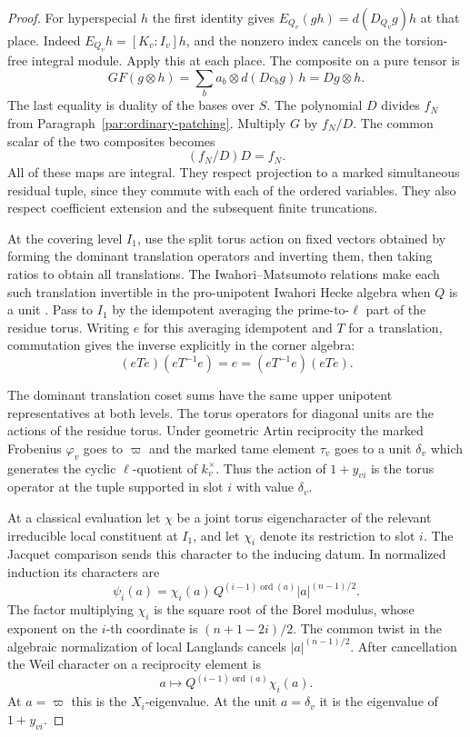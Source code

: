 \begin{proof}
For hyperspecial \(h\) the first identity gives
\(E_{Q_v}(g h)=d(D_{Q_v}g)h\) at that place. Indeed
\(E_{Q_v}h=[K_v:I_v]h\), and the nonzero index cancels
on the torsion-free integral module. Apply this at each place. The composite on a pure tensor is
\[
      GF(g\otimes h)=\sum_b a_b\otimes d(Dc_bg)\,h
                                      =Dg\otimes h .
\]
The last equality is duality of the bases over \(S\).
The polynomial \(D\) divides \(f_N\) from
Paragraph~\ref{par:ordinary-patching}. Multiply \(G\) by \(f_N/D\). The common scalar of the two composites becomes
\[
 (f_N/D)D=f_N.
\]
All of these maps
are integral. They respect projection to a marked
simultaneous residual tuple, since they commute with each
of the ordered variables. They also respect coefficient
extension and the subsequent finite truncations.

At the covering level \(I_1\), use the split torus action
on fixed vectors obtained by forming the dominant
translation operators and inverting them, then taking
ratios to obtain all translations. The Iwahori--Matsumoto
relations make each such translation invertible in the
pro-unipotent Iwahori Hecke algebra when \(Q\) is a unit
\cite[Theorem 1 and its corollary]{vigneras-iwahori}.
Pass to \(I_1\) by the idempotent averaging the
prime-to-\(\ell\) part of the residue torus. Writing \(e\) for this averaging idempotent and \(T\) for a translation, commutation gives the inverse explicitly in the corner algebra:
\[
 (eTe)(eT^{-1}e)=e=(eT^{-1}e)(eTe).
\]

The dominant translation coset sums have the same upper unipotent representatives at both levels. The torus operators for diagonal units
are the actions of the
residue torus. Under geometric Artin reciprocity the
marked Frobenius \(\varphi_v\) goes to \(\varpi\) and the
marked tame element \(\tau_v\) goes to a unit \(\delta_v\)
which generates the cyclic \(\ell\)-quotient of
\(k_v^\times\). Thus the action of \(1+y_{vi}\) is the
torus operator at the tuple supported in slot \(i\)
with value \(\delta_v\).

At a classical evaluation let \(\chi\) be a joint torus
eigencharacter of the relevant irreducible local
constituent at \(I_1\), and let \(\chi_i\) denote its
restriction to slot \(i\). The Jacquet comparison sends
this character to the inducing datum. In normalized
induction its characters are
\[
 \psi_i(a)=\chi_i(a)\,Q^{(i-1)\operatorname{ord}(a)}
                         |a|^{(n-1)/2}.
\]
The factor multiplying \(\chi_i\) is the square root of
the Borel modulus, whose exponent on the \(i\)-th
coordinate is \((n+1-2i)/2\). The common twist in the
algebraic normalization of local Langlands cancels
\(|a|^{(n-1)/2}\). After cancellation the Weil character on a reciprocity element is
\[
         a\longmapsto Q^{(i-1)\operatorname{ord}(a)}\chi_i(a).
\]
At \(a=\varpi\) this is the \(X_i\)-eigenvalue. At the unit
\(a=\delta_v\) it is the eigenvalue of \(1+y_{vi}\).


\end{proof}
